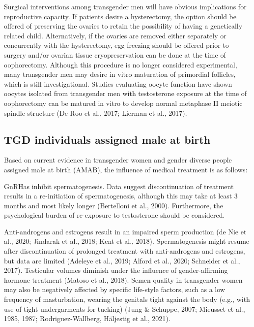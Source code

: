 \documentclass[
]{book}
\begin{document}
Surgical interventions among transgender men
will have obvious implications for reproductive
capacity. If patients desire a hysterectomy, the
option should be offered of preserving the ovaries
to retain the possibility of having a genetically
related child. Alternatively, if the ovaries are
removed either separately or concurrently with
the hysterectomy, egg freezing should be offered
prior to surgery and/or ovarian tissue cryopreservation can be done at the time of oophorectomy. Although this procedure is no longer
considered experimental, many transgender men
may desire in vitro maturation of primordial follicles, which is still investigational. Studies evaluating oocyte function have shown oocytes
isolated from transgender men with testosterone
exposure at the time of oophorectomy can be
matured in vitro to develop normal metaphase II
meiotic spindle structure (De Roo et al., 2017;
Lierman et al., 2017).

\hypertarget{tgd-individuals-assigned-male-at-birth}{%
\subsection*{TGD individuals assigned male at birth}\label{tgd-individuals-assigned-male-at-birth}}

Based on current evidence in transgender
women and gender diverse people assigned male
at birth (AMAB), the influence of medical treatment is as follows:

GnRHas inhibit spermatogenesis. Data suggest
discontinuation of treatment results in a
re-initiation of spermatogenesis, although this
may take at least 3 months and most likely longer
(Bertelloni et al., 2000). Furthermore, the psychological burden of re-exposure to testosterone
should be considered.

Anti-androgens and estrogens result in an
impaired sperm production (de Nie et al., 2020;
Jindarak et al., 2018; Kent et al., 2018).
Spermatogenesis might resume after discontinuation of prolonged treatment with anti-androgens
and estrogens, but data are limited (Adeleye
et al., 2019; Alford et al., 2020; Schneider et al.,
2017). Testicular volumes diminish under the
influence of gender-affirming hormone treatment
(Matoso et al., 2018). Semen quality in transgender women may also be negatively affected by
specific life-style factors, such as a low frequency
of masturbation, wearing the genitals tight against
the body (e.g., with use of tight undergarments
for tucking) (Jung \& Schuppe, 2007; Mieusset
et al., 1985, 1987; Rodriguez-Wallberg, Häljestig
et al., 2021).
\end{document}
